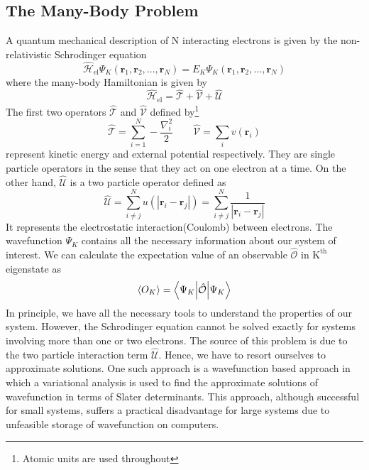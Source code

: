 \subsection{The Many-Body Problem}
A quantum mechanical description of N interacting electrons is given by the non-relativistic Schrodinger equation
    \begin{equation}
        \hat{\mathcal{H}}_{\text{el}}\Psi_K(\mathbf{r}_1,\mathbf{r}_2,...,\mathbf{r}_N) = E_K\Psi_K(\mathbf{r}_1,\mathbf{r}_2,...,\mathbf{r}_N)
    \end{equation}
where the many-body Hamiltonian is given by
    \begin{equation}
        \hat{\mathcal{H}}_{\text{el}} = \hat{\mathcal{T}} + \hat{\mathcal{V}} + \hat{\mathcal{U}}
    \end{equation}
The first  two operators $\hat{\mathcal{T}}$ and $\hat{\mathcal{V}}$ defined by\footnote{Atomic units are used throughout}
    \begin{equation}
        \hat{\mathcal{T}} = \sum_{i=1}^N-\frac{\nabla_i^2}{2} \qquad  \hat{\mathcal{V}} = \sum_i v(\mathbf{r}_i)
    \end{equation}
represent kinetic energy and external potential respectively. They are single particle operators in the sense that they act on one electron at a time. On the other hand, $\hat{\mathcal{U}}$ is a two particle operator defined as 
    \begin{equation}
        \hat{\mathcal{U}} = \sum_{i\neq j}^Nu(|\mathbf{r}_i-\mathbf{r}_j|) = \sum_{i \neq j}^N \frac{1}{|\mathbf{r}_i-\mathbf{r}_j|}
    \end{equation}
It represents the electrostatic interaction(Coulomb) between electrons. The wavefunction $\Psi_K$ contains all the necessary information about our system of interest. We can calculate the expectation value of an observable $\hat{\mathcal{O}}$ in $\text{K}^{\text{th}}$ eigenstate as 
\begin{equation}
    \expval{O_K} = \ev**{\hat{\mathcal{O}}}{\Psi_K}
\end{equation}
In principle, we have all the necessary tools to understand the properties of our system. However, the Schrodinger equation cannot be solved exactly for systems involving more than one or two electrons. The source of this problem is due to the two particle interaction term $\hat{\mathcal{U}}$. Hence, we have to resort ourselves to approximate solutions. One such approach is a wavefunction based approach in which a variational analysis is used to find the approximate solutions of wavefunction in terms of Slater determinants. This approach, although successful for small systems, suffers a practical disadvantage for large systems due to unfeasible storage of wavefunction on computers. 
